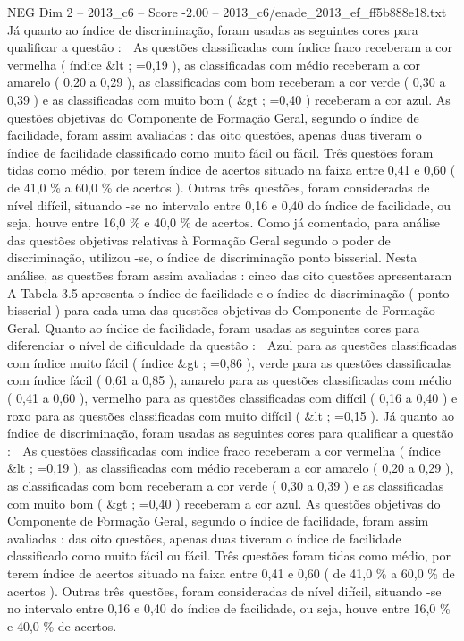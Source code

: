 \begin{textsample}{NEG Dim 2 – 2013\_c6 – Score -2.00 – 2013\_c6/enade\_2013\_ef\_ff5b888e18.txt}
Já quanto ao índice de discriminação, foram usadas as seguintes cores para qualificar a questão :  As questões classificadas com índice fraco receberam a cor vermelha ( índice \&lt ; =0,19 ), as classificadas com médio receberam a cor amarelo ( 0,20 a 0,29 ), as classificadas com bom receberam a cor verde ( 0,30 a 0,39 ) e as classificadas com muito bom ( \&gt ; =0,40 ) receberam a cor azul.
As questões objetivas do Componente de Formação Geral, segundo o índice de facilidade, foram assim avaliadas : das oito questões, apenas duas tiveram o índice de facilidade classificado como muito fácil ou fácil.
Três questões foram tidas como médio, por terem índice de acertos situado na faixa entre 0,41 e 0,60 ( de 41,0 \% a 60,0 \% de acertos ).
Outras três questões, foram consideradas de nível difícil, situando -se no intervalo entre 0,16 e 0,40 do índice de facilidade, ou seja, houve entre 16,0 \% e 40,0 \% de acertos.
Como já comentado, para análise das questões objetivas relativas à Formação Geral segundo o poder de discriminação, utilizou -se, o índice de discriminação ponto bisserial.
Nesta análise, as questões foram assim avaliadas : cinco das oito questões apresentaram A Tabela 3.5 apresenta o índice de facilidade e o índice de discriminação ( ponto bisserial ) para cada uma das questões objetivas do Componente de Formação Geral.
Quanto ao índice de facilidade, foram usadas as seguintes cores para diferenciar o nível de dificuldade da questão :  Azul para as questões classificadas com índice muito fácil ( índice \&gt ; =0,86 ), verde para as questões classificadas com índice fácil ( 0,61 a 0,85 ), amarelo para as questões classificadas com médio ( 0,41 a 0,60 ), vermelho para as questões classificadas com difícil ( 0,16 a 0,40 ) e roxo para as questões classificadas com muito difícil ( \&lt ; =0,15 ).
Já quanto ao índice de discriminação, foram usadas as seguintes cores para qualificar a questão :  As questões classificadas com índice fraco receberam a cor vermelha ( índice \&lt ; =0,19 ), as classificadas com médio receberam a cor amarelo ( 0,20 a 0,29 ), as classificadas com bom receberam a cor verde ( 0,30 a 0,39 ) e as classificadas com muito bom ( \&gt ; =0,40 ) receberam a cor azul.
As questões objetivas do Componente de Formação Geral, segundo o índice de facilidade, foram assim avaliadas : das oito questões, apenas duas tiveram o índice de facilidade classificado como muito fácil ou fácil.
Três questões foram tidas como médio, por terem índice de acertos situado na faixa entre 0,41 e 0,60 ( de 41,0 \% a 60,0 \% de acertos ).
Outras três questões, foram consideradas de nível difícil, situando -se no intervalo entre 0,16 e 0,40 do índice de facilidade, ou seja, houve entre 16,0 \% e 40,0 \% de acertos.

\end{textsample}
